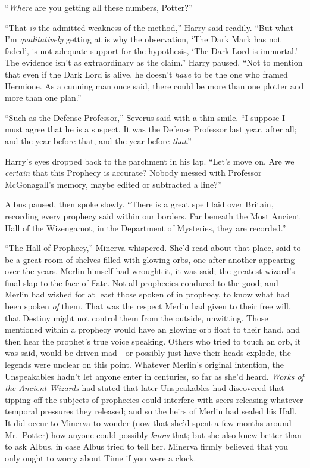 “\emph{Where} are you getting all these numbers, Potter?”

“That \emph{is} the admitted weakness of the method,” Harry said readily. “But what I’m \emph{qualitatively} getting at is why the observation, ‘The Dark Mark has not faded’, is not adequate support for the hypothesis, ‘The Dark Lord is immortal.’ The evidence isn’t as extraordinary as the claim.” Harry paused. “Not to mention that even if the Dark Lord is alive, he doesn’t \emph{have} to be the one who framed Hermione. As a cunning man once said, there could be more than one plotter and more than one plan.”

“Such as the Defense Professor,” Severus said with a thin smile. “I suppose I must agree that he is a suspect. It was the Defense Professor last year, after all; and the year before that, and the year before \emph{that}.”

Harry’s eyes dropped back to the parchment in his lap. “Let’s move on. Are we \emph{certain} that this Prophecy is accurate? Nobody messed with Professor McGonagall’s memory, maybe edited or subtracted a line?”

Albus paused, then spoke slowly. “There is a great spell laid over Britain, recording every prophecy said within our borders. Far beneath the Most Ancient Hall of the Wizengamot, in the Department of Mysteries, they are recorded.”

“The Hall of Prophecy,” Minerva whispered. She’d read about that place, said to be a great room of shelves filled with glowing orbs, one after another appearing over the years. Merlin himself had wrought it, it was said; the greatest wizard’s final slap to the face of Fate. Not all prophecies conduced to the good; and Merlin had wished for at least those spoken of in prophecy, to know what had been spoken \emph{of} them. That was the respect Merlin had given to their free will, that Destiny might not control them from the outside, unwitting. Those mentioned within a prophecy would have an glowing orb float to their hand, and then hear the prophet’s true voice speaking. Others who tried to touch an orb, it was said, would be driven mad—or possibly just have their heads explode, the legends were unclear on this point. Whatever Merlin’s original intention, the Unspeakables hadn’t let anyone enter in centuries, so far as she’d heard. \emph{Works of the Ancient Wizards} had stated that later Unspeakables had discovered that tipping off the subjects of prophecies could interfere with seers releasing whatever temporal pressures they released; and so the heirs of Merlin had sealed his Hall. It did occur to Minerva to wonder (now that she’d spent a few months around Mr.~Potter) how anyone could possibly \emph{know} that; but she also knew better than to ask Albus, in case Albus tried to tell her. Minerva firmly believed that you only ought to worry about Time if you were a clock.

